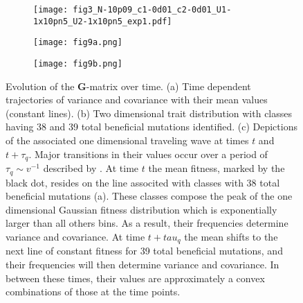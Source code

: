 \documentclass[11pt,twocolumn]{article}
\newcommand{\G}{\textbf{G}}
\begin{document}
\begin{figure}[h!]
\begin{subfigure}[b!]{0.48\linewidth}
\texttt{[image: fig3\_N-10p09\_c1-0d01\_c2-0d01\_U1-1x10pn5\_U2-1x10pn5\_exp1.pdf]}
\caption{}\label{fig:3a}
\end{subfigure}
\begin{subfigure}[b!]{0.48\linewidth}
\texttt{[image: fig9a.png]}
\caption{}\label{fig:3b}
\end{subfigure}

\begin{subfigure}[b]{1\linewidth}
\texttt{[image: fig9b.png]}
\caption{}\label{fig:3c}
\end{subfigure}
\caption{\footnotesize Evolution of the \G-matrix over time. (a) Time dependent trajectories of variance and covariance with their mean values (constant lines). (b) Two dimensional trait distribution with classes having 38 and 39 total beneficial mutations identified. (c) Depictions of the associated one dimensional traveling wave at times $t$ and $t+\tau_q$. Major transitions in their values occur over a period of $\tau_q \sim v^{-1}$ described by \citet{desai2007beneficial}. At time $t$ the mean fitness, marked by the black dot, resides on the line associted with classes with 38 total beneficial mutations (a). These classes compose the peak of the one dimensional Gaussian fitness distribution which is exponentially larger than all others bins. As a result, their frequencies determine variance and covariance. At time $t+tau_q$ the mean shifts to the next line of constant fitness for 39 total beneficial mutations, and their frequencies will then determine variance and covariance. In between these times, their values are approximately a convex combinations of those at the time points.}\label{fig:3}
\end{figure}
\end{document}
